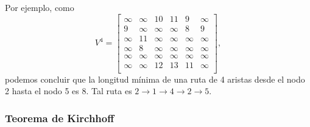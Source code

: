 Por ejemplo, como
\[
V^4= \begin{bmatrix}
  \infty & \infty & 10 & 11 & 9 & \infty \\
  9 & \infty & \infty & \infty & 8 & 9 \\
  \infty & 11 & \infty & \infty & \infty & \infty \\
  \infty & 8 & \infty & \infty & \infty & \infty \\
  \infty & \infty & \infty & \infty & \infty & \infty \\
  \infty & \infty & 12 & 13 & 11 & \infty \\
 \end{bmatrix},
\]
podemos concluir que la longitud mínima de una ruta
de 4 aristas
desde el nodo 2 hasta el nodo 5 es 8.
Tal ruta es
$2 \rightarrow 1 \rightarrow 4 \rightarrow 2 \rightarrow 5$.

\subsubsection{Teorema de Kirchhoff}


